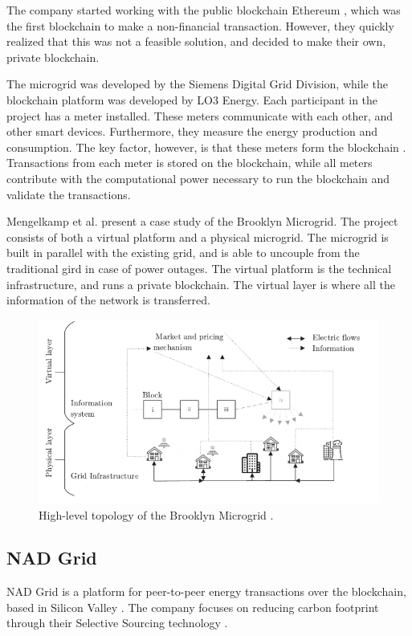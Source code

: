 The company started working with the public blockchain Ethereum \cite{medium_bm, motherboard_bm}, which was the first blockchain to make a non-financial transaction. However, they quickly realized that this was not a feasible solution, and decided to make their own, private blockchain.

The microgrid was developed by the Siemens Digital Grid Division, while the blockchain platform was developed by LO3 Energy. 
Each participant in the project has a meter installed. These meters communicate with each other, and other smart devices. Furthermore, they measure the energy production and consumption. The key factor, however, is that these meters form the blockchain \cite{medium_bm, hbr_grid}. Transactions from each meter is stored on the blockchain, while all meters contribute with the computational power necessary to run the blockchain and validate the transactions. 

Mengelkamp et al. \cite{Brooklyn_Mengelkamp} present a case study of the Brooklyn Microgrid. The project consists of both a virtual platform and a physical microgrid. The microgrid is built in parallel with the existing grid, and is able to uncouple from the traditional gird in case of power outages. The virtual platform is the technical infrastructure, and runs a private blockchain. The virtual layer is where all the information of the network is transferred. 

\begin{figure}[htb]
    \centering
    \includegraphics[width=1\textwidth]{Images/bm}
    \caption{High-level topology of the Brooklyn Microgrid \cite{Brooklyn_Mengelkamp}.}
    \label{fig:bm}
\end{figure}
 

\subsection{NAD Grid}
NAD Grid is a platform for peer-to-peer energy transactions over the blockchain, based in Silicon Valley \cite{nad_youtube}. The company focuses on reducing carbon footprint through their Selective Sourcing technology \cite{nad}.


